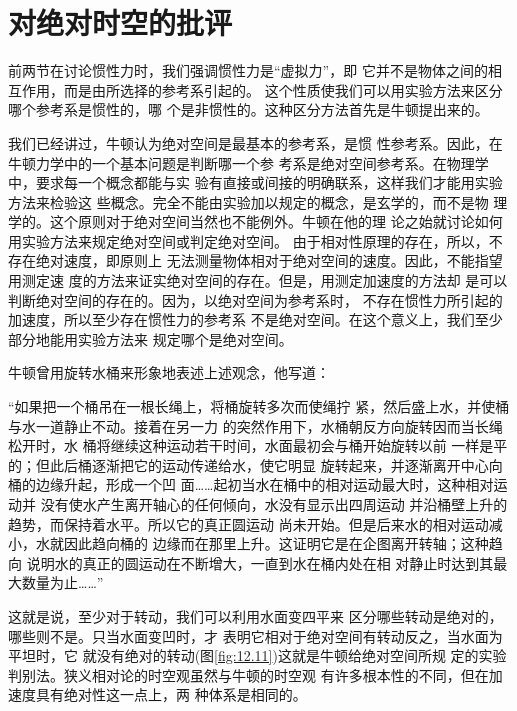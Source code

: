 \section{对绝对时空的批评}\label{sec:12.03}

前两节在讨论惯性力时，我们强调惯性力是“虚拟力”，即
它并不是物体之间的相互作用，而是由所选择的参考系引起的。
这个性质使我们可以用实验方法来区分哪个参考系是惯性的，哪
个是非惯性的。这种区分方法首先是牛顿提出来的。

我们已经讲过，牛顿认为绝对空间是最基本的参考系，是惯
性参考系。因此，在牛顿力学中的一个基本问题是判断哪一个参
考系是绝对空间参考系。在物理学中，要求每一个概念都能与实
验有直接或间接的明确联系，这样我们才能用实验方法来检验这
些概念。完全不能由实验加以规定的概念，是玄学的，而不是物
理学的。这个原则对于绝对空间当然也不能例外。牛顿在他的理
论之始就讨论如何用实验方法来规定绝对空间或判定绝对空间。
由于相对性原理的存在，所以，不存在绝对速度，即原则上
无法测量物体相对于绝对空间的速度。因此，不能指望用测定速
度的方法来证实绝对空间的存在。但是，用测定加速度的方法却
是可以判断绝对空间的存在的。因为，以绝对空间为参考系时，
不存在惯性力所引起的加速度，所以至少存在惯性力的参考系
不是绝对空间。在这个意义上，我们至少部分地能用实验方法来
规定哪个是绝对空间。

牛顿曾用旋转水桶来形象地表述上述观念，他写道：

\begin{quoting}
  “如果把一个桶吊在一根长绳上，将桶旋转多次而使绳拧
  紧，然后盛上水，并使桶与水一道静止不动。接着在另一力
  的突然作用下，水桶朝反方向旋转因而当长绳松开时，水
  桶将继续这种运动若干时间，水面最初会与桶开始旋转以前
  一样是平的；但此后桶逐渐把它的运动传递给水，使它明显
  旋转起来，并逐渐离开中心向桶的边缘升起，形成一个凹
  面……起初当水在桶中的相对运动最大时，这种相对运动并
  没有使水产生离开轴心的任何倾向，水没有显示出四周运动
  并沿桶壁上升的趋势，而保持着水平。所以它的真正圆运动
  尚未开始。但是后来水的相对运动减小，水就因此趋向桶的
  边缘而在那里上升。这证明它是在企图离开转轴；这种趋向
  说明水的真正的圆运动在不断增大，一直到水在桶内处在相
  对静止时达到其最大数量为止……”
\end{quoting}

这就是说，至少对于转动，我们可以利用水面变四平来
区分哪些转动是绝对的，哪些则不是。只当水面变凹时，才
表明它相对于绝对空间有转动反之，当水面为平坦时，它
就没有绝对的转动(图\ref{fig:12.11})这就是牛顿给绝对空间所规
定的实验判别法。狭义相对论的时空观虽然与牛顿的时空观
有许多根本性的不同，但在加速度具有绝对性这一点上，两
种体系是相同的。

